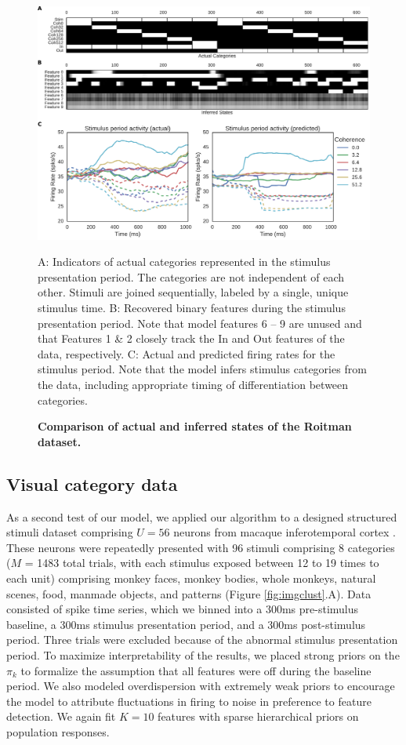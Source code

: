\documentclass[12pt,a4paper]{article}
\begin{document}
\begin{figure}[!ht]
    \includegraphics[width=\linewidth]{figures/roitman}
	\caption{\bf Comparison of actual and inferred states of the Roitman dataset.}
	A: Indicators of actual categories represented in the stimulus presentation period. The categories are not independent of each other. Stimuli are joined sequentially, labeled by a single, unique stimulus time. B: Recovered binary features during the stimulus presentation period. Note that model features 6 -- 9 are unused and that Features 1 \& 2 closely track the In and Out features of the data, respectively. C: Actual and predicted firing rates for the stimulus period. Note that the model infers stimulus categories from the data, including appropriate timing of differentiation between categories.
	\label{roitman}
\end{figure}

\subsection*{Visual category data}
\label{it_neuron_expt}
As a second test of our model, we applied our algorithm to a designed structured stimuli dataset comprising $U = 56$ neurons from macaque inferotemporal cortex \cite{McMahon2014-qq}. These neurons were repeatedly presented with 96 stimuli comprising 8 categories ($M$ = 1483 total trials, with each stimulus exposed between 12 to 19 times to each unit) comprising monkey faces, monkey bodies, whole monkeys, natural scenes, food, manmade objects, and patterns (Figure \ref{fig:imgclust}.A). Data consisted of spike time series, which we binned into a 300ms pre-stimulus baseline, a 300ms stimulus presentation period, and a 300ms post-stimulus period. Three trials were excluded because of the abnormal stimulus presentation period. To maximize interpretability of the results, we placed strong priors on the $\pi_k$ to formalize the assumption that all features were off during the baseline period. We also modeled overdispersion with extremely weak priors to encourage the model to attribute fluctuations in firing to noise in preference to feature detection. We again fit $K = 10$ features with sparse hierarchical priors on population responses.
\end{document}
